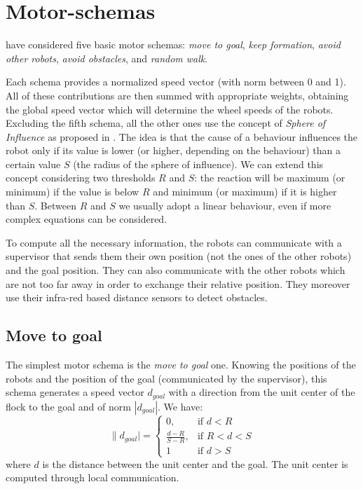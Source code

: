\documentclass[journal]{IEEEtran}
\begin{document}
\section{Motor-schemas}
\label{sec:2}
 have considered five basic motor schemas: \textit{move to goal}, \textit{keep formation}, \textit{avoid other robots}, \textit{avoid obstacles}, and \textit{random walk}. %

Each schema provides a normalized speed vector (with norm between
0 and 1). All of these contributions are then summed with appropriate weights, obtaining the
global speed vector which will determine the wheel speeds of the robots. 
Excluding the fifth schema, all the other ones use the concept of
\textit{Sphere of Influence} as proposed in
\cite{IEEEhowto:arkin_motor_schemas}. The idea is that the cause of a
behaviour influences the robot only if its value is lower (or higher,
depending on the behaviour) than a certain value $S$ (the radius of the sphere
of influence). We can extend this concept considering two thresholds $R$
and $S$: the reaction will be maximum (or minimum) if the value is below
$R$ and minimum (or maximum) if it is higher than $S$. Between $R$ and $S$ we 
usually adopt a linear behaviour, even if more complex equations can be
considered.

To compute all the necessary information, the robots can communicate
with a supervisor that sends them their own position (not the ones of 
the other robots) and the goal position. They can also communicate with 
the other robots which are not too far away in order to exchange their
relative position. They moreover use their infra-red based distance sensors 
to detect obstacles.

\subsection{Move to goal}  
The simplest motor schema is the \textit{move to goal} one. Knowing
the positions of the robots and the position of the goal (communicated by the supervisor), 
this schema generates a speed vector $d_{goal}$ with a direction from the unit center of the flock to the goal and of norm $|d_{goal}|$. We have:
\begin{equation}
\|d_{goal}| = \begin{cases} 0, & \mbox{if }  d<R \\ \frac{d-R}{S-R}, & \mbox{if }
  R<d<S \\ 1 & \mbox{if } d>S\end{cases}
\end{equation}
where $d$ is the distance between the unit center and the goal. The unit center is computed through local communication.
\end{document}
